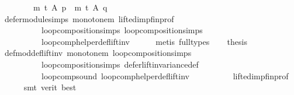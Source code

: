 \begin{isabellebody}
\ \ \ \ \ \ \ \ {\isacharparenleft}{\kern0pt}m\ {\isasymcirclearrowleft}\isactrlsub t{\isacharparenright}{\kern0pt}\ A\ p\ {\isacharequal}{\kern0pt}\ {\isacharparenleft}{\kern0pt}m\ {\isasymcirclearrowleft}\isactrlsub t{\isacharparenright}{\kern0pt}\ A\ q{\isachardoublequoteclose}\isanewline
\ \ \ \ \isamarkupfalse%
\ defer{\isacharunderscore}{\kern0pt}module{\isachardot}{\kern0pt}simps\ monotone{\isacharunderscore}{\kern0pt}m\ lifted{\isacharunderscore}{\kern0pt}imp{\isacharunderscore}{\kern0pt}fin{\isacharunderscore}{\kern0pt}prof\isanewline
\ \ \ \ \ \ \ \ \ \ loop{\isacharunderscore}{\kern0pt}composition{\isachardot}{\kern0pt}simps{\isacharparenleft}{\kern0pt}{}{\isacharparenright}{\kern0pt}\ loop{\isacharunderscore}{\kern0pt}composition{\isachardot}{\kern0pt}simps{\isacharparenleft}{\kern0pt}{}{\isacharparenright}{\kern0pt}\isanewline
\ \ \ \ \ \ \ \ \ \ loop{\isacharunderscore}{\kern0pt}comp{\isacharunderscore}{\kern0pt}helper{\isacharunderscore}{\kern0pt}def{\isacharunderscore}{\kern0pt}lift{\isacharunderscore}{\kern0pt}inv{}\isanewline
\ \ \ \ \isamarkupfalse%
\ {\isacharparenleft}{\kern0pt}metis\ {\isacharparenleft}{\kern0pt}full{\isacharunderscore}{\kern0pt}types{\isacharparenright}{\kern0pt}{\isacharparenright}{\kern0pt}\isanewline
\ \ \isamarkupfalse%
\ {\isacharquery}{\kern0pt}thesis\isanewline
\ \ \ \ \isamarkupfalse%
\ def{\isacharunderscore}{\kern0pt}mod{\isacharunderscore}{\kern0pt}def{\isacharunderscore}{\kern0pt}lift{\isacharunderscore}{\kern0pt}inv\ monotone{\isacharunderscore}{\kern0pt}m\ loop{\isacharunderscore}{\kern0pt}composition{\isachardot}{\kern0pt}simps{\isacharparenleft}{\kern0pt}{}{\isacharparenright}{\kern0pt}\isanewline
\ \ \ \ \ \ \ \ \ \ loop{\isacharunderscore}{\kern0pt}composition{\isachardot}{\kern0pt}simps{\isacharparenleft}{\kern0pt}{}{\isacharparenright}{\kern0pt}\ defer{\isacharunderscore}{\kern0pt}lift{\isacharunderscore}{\kern0pt}invariance{\isacharunderscore}{\kern0pt}def\isanewline
\ \ \ \ \ \ \ \ \ \ loop{\isacharunderscore}{\kern0pt}comp{\isacharunderscore}{\kern0pt}sound\ loop{\isacharunderscore}{\kern0pt}comp{\isacharunderscore}{\kern0pt}helper{\isacharunderscore}{\kern0pt}def{\isacharunderscore}{\kern0pt}lift{\isacharunderscore}{\kern0pt}inv{}\isanewline
\ \ \ \ \ \ \ \ \ \ lifted{\isacharunderscore}{\kern0pt}imp{\isacharunderscore}{\kern0pt}fin{\isacharunderscore}{\kern0pt}prof\isanewline
\ \ \ \ \isamarkupfalse%
\ {\isacharparenleft}{\kern0pt}smt\ {\isacharparenleft}{\kern0pt}verit{\isacharcomma}{\kern0pt}\ best{\isacharparenright}{\kern0pt}{\isacharparenright}{\kern0pt}\isanewline

\end{isabellebody}
